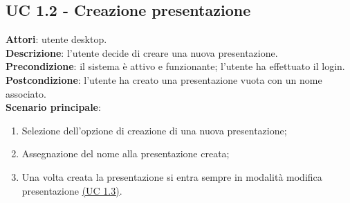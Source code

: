 \subsection{UC 1.2 - Creazione presentazione}{
	\label{uc1.2}
	\textbf{Attori}: utente desktop.	\\
	\textbf{Descrizione}: l'utente decide di creare una nuova presentazione.	\\
	\textbf{Precondizione}: il sistema è attivo e funzionante; l'utente ha effettuato il login.	\\
	\textbf{Postcondizione}: l'utente ha creato una presentazione vuota con un nome associato.	\\
	\textbf{Scenario principale}:
	\begin{enumerate}
		\item Selezione dell'opzione di creazione di una nuova presentazione;
		\item Assegnazione del nome alla presentazione creata;
		\item Una volta creata la presentazione si entra sempre in modalità modifica presentazione \hyperref[uc1.3]{(UC 1.3)}.
	\end{enumerate}
	}